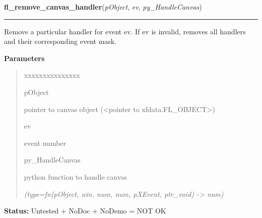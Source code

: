 \hspace{.8\funcindent}\begin{boxedminipage}{\funcwidth}

    \raggedright \textbf{fl\_remove\_canvas\_handler}(\textit{pObject}, \textit{ev}, \textit{py\_HandleCanvas})

    \vspace{-1.5ex}

    \rule{\textwidth}{0.5\fboxrule}
\setlength{\parskip}{2ex}
    Remove a particular handler for event ev. If ev is invalid, removes all
    handlers and their corresponding event mask.

\setlength{\parskip}{1ex}
      \textbf{Parameters}
      \vspace{-1ex}

      \begin{quote}
        \begin{Ventry}{xxxxxxxxxxxxxxx}

          \item[pObject]

          pointer to canvas object ({\textless}pointer to 
          xfdata.FL\_OBJECT{\textgreater})

          \item[ev]

          event number

          \item[py\_HandleCanvas]

          python function to handle canvas

            {\it (type=fn(pObject, win, num, num, pXEvent, ptr\_void) -{\textgreater} num)}

        \end{Ventry}

      \end{quote}

\textbf{Status:} Untested + NoDoc + NoDemo = NOT OK



    \end{boxedminipage}

    \label{xformslib:library:fl_hide_canvas}

    \vspace{0.5ex}

